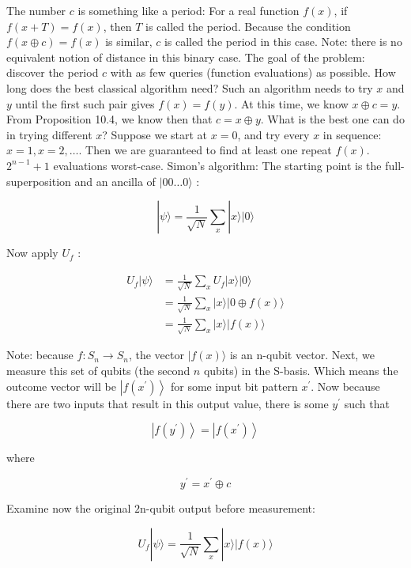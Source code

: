 \documentclass[main.tex]{subfiles}
\begin{document}
    The number $c$ is something like a period: For a real function $f(x)$, if $f(x+T)=f(x)$, then $T$ is called the period. Because the condition $f(x \oplus c)=f(x)$ is similar, $c$ is called the period in this case. Note: there is no equivalent notion of distance in this binary case. The goal of the problem: discover the period $c$ with as few queries (function evaluations) as possible. How long does the best classical algorithm need? Such an algorithm needs to try $x$ and $y$ until the first such pair gives $f(x)=f(y)$. At this time, we know $x \oplus c=y$. From Proposition 10.4, we know then that $c=x \oplus y$. What is the best one can do in trying different $x$? Suppose we start at $x=0$, and try every $x$ in sequence: $x=1, x=2, \ldots$. Then we are guaranteed to find at least one repeat $f(x)$. $2^{n-1}+1$ evaluations worst-case. Simon's algorithm: The starting point is the full-superposition and an ancilla of $|00 \ldots 0\rangle$ :
    
    $$
    |\psi\rangle=\frac{1}{\sqrt{N}} \sum_{x}|x\rangle|0\rangle
    $$
    
    Now apply $U_{f}$ :
    
    $$
    \begin{aligned}
    U_{f}|\psi\rangle &=\frac{1}{\sqrt{N}} \sum_{x} U_{f}|x\rangle|0\rangle \\
    &=\frac{1}{\sqrt{N}} \sum_{x}|x\rangle|0 \oplus f(x)\rangle \\
    &=\frac{1}{\sqrt{N}} \sum_{x}|x\rangle|f(x)\rangle
    \end{aligned}
    $$
    
    Note: because $f: S_{n} \rightarrow S_{n}$, the vector $|f(x)\rangle$ is an n-qubit vector. Next, we measure this set of qubits (the second $n$ qubits) in the S-basis. Which means the outcome vector will be $\left|f\left(x^{\prime}\right)\right\rangle$ for some input bit pattern $x^{\prime}$. Now because there are two inputs that result in this output value, there is some $y^{\prime}$ such that
    
    $$
    \left|f\left(y^{\prime}\right)\right\rangle=\left|f\left(x^{\prime}\right)\right\rangle
    $$
    
    where
    
    $$
    y^{\prime}=x^{\prime} \oplus c
    $$
    
    Examine now the original $2 \mathrm{n}$-qubit output before measurement:
    
    $$
    U_{f}|\psi\rangle=\frac{1}{\sqrt{N}} \sum_{x}|x\rangle|f(x)\rangle
    $$
    
\end{document}

